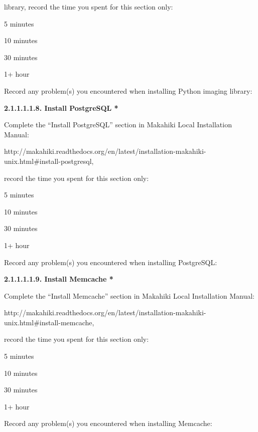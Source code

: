 library, record the time you spent for this section only:

\begin{radiobutton}
\item 5 minutes
\item  10 minutes
\item  30 minutes
\item  1+ hour
\end{radiobutton}

Record any problem(s) you encountered when installing Python imaging library: 

\underline{\hspace{3cm}}

{\bf 2.1.1.1.1.8. Install PostgreSQL *}

Complete the ``Install PostgreSQL'' section in Makahiki Local Installation Manual:

http://makahiki.readthedocs.org/en/latest/installation-makahiki-unix.html\#install-postgresql, 

record the time you spent for this section only:

\begin{radiobutton}
\item 5 minutes
\item  10 minutes
\item  30 minutes
\item  1+ hour
\end{radiobutton}

Record any problem(s) you encountered when installing PostgreSQL: \underline{\hspace{4cm}}

{\bf 2.1.1.1.1.9. Install Memcache *}

Complete the ``Install Memcache'' section in Makahiki Local Installation Manual:

http://makahiki.readthedocs.org/en/latest/installation-makahiki-unix.html\#install-memcache, 

record the time you spent for this section only:

\begin{radiobutton}
\item 5 minutes
\item  10 minutes
\item  30 minutes
\item  1+ hour
\end{radiobutton}

Record any problem(s) you encountered when installing Memcache: \underline{\hspace{4cm}}


